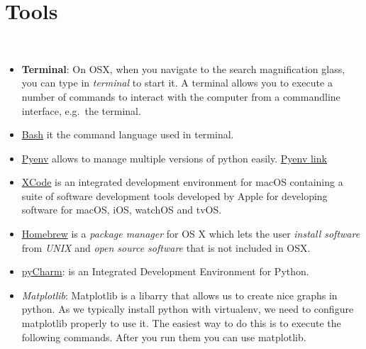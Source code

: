 

\chapter{Tools}\label{tools}

\FILENAME\

\begin{itemize}
\item
  \textbf{Terminal}: On OSX, when you navigate to the search
  magnification glass, you can type in \emph{terminal} to start it. A
  terminal allows you to execute a number of commands to interact with
  the computer from a commandline interface, e.g.~the terminal.
\item
  \href{https://linuxconfig.org/bash-scripting-tutorial}{Bash} it the
  command language used in terminal.
\item
  \href{https://cloudmesh.github.io/classes/lesson/prg/pyenv.html?highlight=xcode\#install-pyenv-on-osxhttps://cloudmesh.github.io/classes/lesson/prg/pyenv.html?highlight=xcode\#install-pyenv-on-osx}{Pyenv}
  allows to manage multiple versions of python easily.
  \href{https://github.com/pyenv/pyenv\#how-it-works}{Pyenv link}
\item
  \href{https://cloudmesh.github.io/classes/lesson/prg/pyenv.html?highlight=xcode\#install-pyenv-on-osxhttps://cloudmesh.github.io/classes/lesson/prg/pyenv.html?highlight=xcode\#install-pyenv-on-osx}{XCode}
  is an integrated development environment for macOS containing a suite
  of software development tools developed by Apple for developing
  software for macOS, iOS, watchOS and tvOS.
\item
  \href{https://brew.sh}{Homebrew} is a \emph{package manager} for OS X
  which lets the user \emph{install software} from \emph{UNIX} and
  \emph{open source software} that is not included in OSX.
\item
  \href{https://www.jetbrains.com/pycharm/download/download-thanks.html?platform=mac\&code=PCC}{pyCharm}:
  is an Integrated Development Environment for Python.
\item
  \emph{Matplotlib}: Matplotlib is a libarry that allows us to create
  nice graphs in python. As we typically install python with virtualenv,
  we need to configure matplotlib properly to use it. The easiest way to
  do this is to execute the following commands. After you run them you
  can use matplotlib.


\end{itemize}
